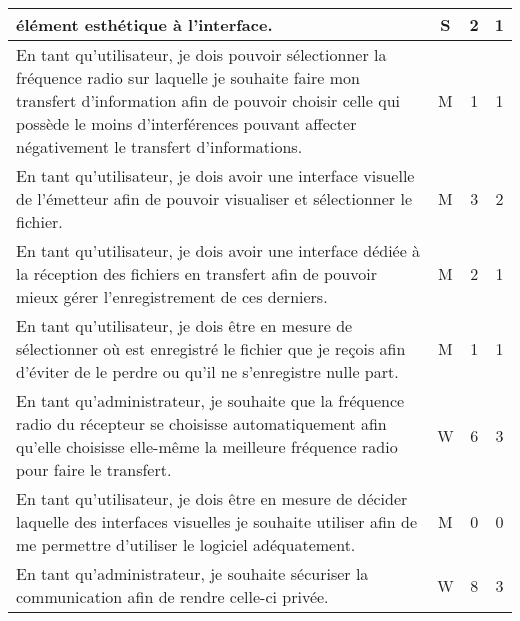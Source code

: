 \begin{table}[ht]
\begin{tabular}{|p{10cm}|c|c|c|}
          élément esthétique à l'interface.
        & S & 2 & 1 \\
    \hline
          En tant qu'utilisateur,
          je dois pouvoir sélectionner la fréquence radio sur laquelle je
          souhaite faire mon transfert d'information afin de pouvoir choisir celle 
          qui possède le moins d'interférences pouvant affecter négativement le transfert d'informations.
        & M & 1 & 1 \\
    \hline
          En tant qu'utilisateur,
          je dois avoir une interface visuelle de l'émetteur afin
          de pouvoir visualiser et sélectionner le fichier.
        & M & 3 & 2 \\
    \hline
          En tant qu'utilisateur,
          je dois avoir une interface dédiée à la réception des
          fichiers en transfert afin de pouvoir mieux gérer
          l'enregistrement de ces derniers.
        & M & 2 & 1 \\
    \hline
          En tant qu'utilisateur,
          je dois être en mesure de sélectionner où est enregistré
          le fichier que je reçois afin d'éviter de le perdre ou
          qu'il ne s'enregistre nulle part.
        & M & 1 & 1 \\
     \hline
          En tant qu'administrateur,
          je souhaite que la fréquence radio du récepteur se choisisse automatiquement
          afin qu'elle choisisse elle-même la meilleure fréquence radio pour faire le transfert.
        & W & 6 & 3 \\
    \hline
          En tant qu'utilisateur,
          je dois être en mesure de décider laquelle des interfaces visuelles je souhaite
          utiliser afin de me permettre d'utiliser le logiciel adéquatement.
        & M & 0 & 0 \\
    \hline
          En tant qu'administrateur, je souhaite sécuriser la
          communication afin de rendre celle-ci privée.
        & W & 8 & 3 \\
    \hline
    \end{tabular}
\end{table}